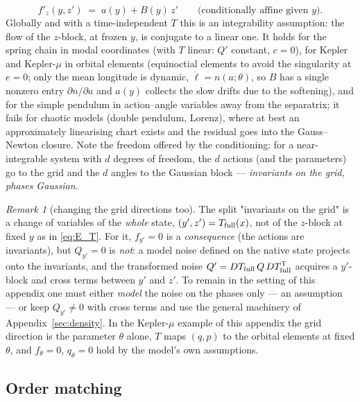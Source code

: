 \documentclass[11pt,a4paper]{article}
\newcommand{\T}{^{\mathsf T}}
\theoremstyle{plain}
\theoremstyle{definition}
\theoremstyle{remark}
\newtheorem{remark}{Remark}
\begin{document}
\begin{equation}
  f'_z(y,z') \;=\; a(y) + B(y)\,z' \qquad\text{(conditionally affine given $y$)}.
  \label{eq:E_affine}
\end{equation}
Globally and with a time-independent $T$ this is an integrability assumption: the flow of the $z$-block, at frozen $y$, is conjugate to a linear one. It holds for the spring chain in modal coordinates (with $T$ linear: $Q'$ constant, $c=0$), for Kepler and Kepler-$\mu$ in orbital elements (equinoctial elements to avoid the singularity at $e=0$; only the mean longitude is dynamic, $\dot\ell = n(a;\theta)$, so $B$ has a single nonzero entry $\partial n/\partial a$ and $a(y)$ collects the slow drifts due to the softening), and for the simple pendulum in action--angle variables away from the separatrix; it fails for chaotic models (double pendulum, Lorenz), where at best an approximately linearising chart exists and the residual goes into the Gauss--Newton closure. Note the freedom offered by the conditioning: for a near-integrable system with $d$ degrees of freedom, the $d$ actions (and the parameters) go to the grid and the $d$ angles to the Gaussian block --- \emph{invariants on the grid, phases Gaussian}.

\begin{remark}[changing the grid directions too]
The split "invariants on the grid" is a change of variables of the \emph{whole} state, $(y',z') = T_{\rm full}(x)$, not of the $z$-block at fixed $y$ as in \eqref{eq:E_T}. For it, $f_{y'}=0$ is a \emph{consequence} (the actions are invariants), but $Q_{y'}=0$ is \emph{not}: a model noise defined on the native state projects onto the invariants, and the transformed noise $Q' = DT_{\rm full}\,Q\,DT_{\rm full}\T$ acquires a $y'$-block and cross terms between $y'$ and $z'$. To remain in the setting of this appendix one must either \emph{model} the noise on the phases only --- an assumption --- or keep $Q_{y'}\ne0$ with cross terms and use the general machinery of Appendix~\ref{sec:density}. In the Kepler-$\mu$ example of this appendix the grid direction is the parameter $\theta$ alone, $T$ maps $(q,p)$ to the orbital elements at fixed $\theta$, and $f_\theta=0$, $q_\theta=0$ hold by the model's own assumptions.
\end{remark}

\subsection{Order matching}
\end{document}
